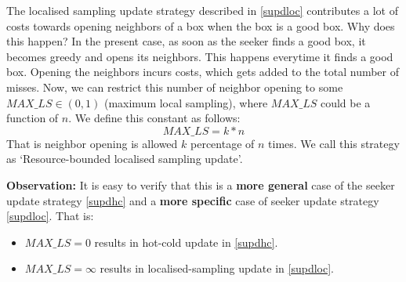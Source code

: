 \documentclass[11pt,a4paper]{article}
\begin{document}
The localised sampling update strategy described in \ref{supdloc} contributes a lot of costs towards opening neighbors of a box when the box is a good box. Why does this happen? In the present case, as soon as the seeker finds a good box, it becomes greedy and opens its neighbors. This happens everytime it finds a good box. Opening the neighbors incurs costs, which gets added to the total number of misses. Now, we can restrict this number of neighbor opening to some $MAX\_LS \in (0,1)$ (maximum local sampling), where $MAX\_LS$ could be a function of $n$. We define this constant as follows:
\begin{equation}
MAX\_LS = k*n
\end{equation}
That is neighbor opening is allowed $k$ percentage of $n$ times. We call this strategy as `Resource-bounded localised sampling update'.

\vspace{0.5cm}

\noindent
\textbf{Observation:} It is easy to verify that this is a \textbf{more general} case 
of the seeker update strategy \ref{supdhc} and a \textbf{more specific} case of seeker update strategy \ref{supdloc}. That is:
\begin{itemize}
	\item $MAX\_LS = 0$ results in hot-cold update in \ref{supdhc}.
	\item $MAX\_LS = \infty$ results in localised-sampling update in \ref{supdloc}.
\end{itemize}
\end{document}

